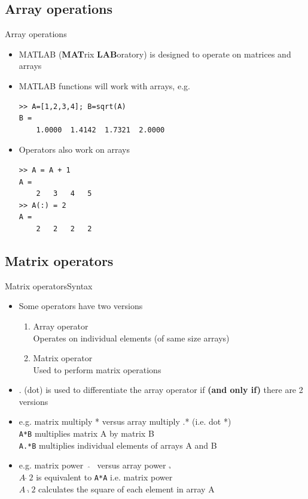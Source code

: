 \documentclass{beamer}
\begin{document}
\subsection{Array operations}
\begin{frame}[fragile]{Array operations}{}
	\begin{itemize}
		\item MATLAB (\textbf{MAT}rix \textbf{LAB}oratory) is designed to operate on matrices and arrays
		\item MATLAB functions will work with arrays, e.g.
		
		\begin{lstlisting}[style=Matlab-editor]
>> A=[1,2,3,4]; B=sqrt(A)
B = 
	1.0000	1.4142	1.7321	2.0000
		\end{lstlisting}
		
		\item Operators also work on arrays
		
		\begin{lstlisting}[style=Matlab-editor]
>> A = A + 1
A = 
	2	3	4	5		
>> A(:) = 2
A = 
	2	2	2	2
		\end{lstlisting}
	\end{itemize}
\end{frame}

\subsection{Matrix operators}
\begin{frame}{Matrix operators}{Syntax}
	\label{sec:matrix_operators}
	\begin{itemize}
		\item Some operators have two versions
		\begin{enumerate}
			\item Array operator\\
			Operates on individual elements (of same size arrays)
			\item Matrix operator\\
			Used to perform matrix operations
		\end{enumerate}
		\item . (dot) is used to differentiate the array operator if \textbf{(and only if)} there are 2 versions\\
		\item e.g. matrix multiply * versus array multiply .* (i.e. dot *)\\
		\texttt{A*B} multiplies matrix A by matrix B\\
		\texttt{A.*B} multiplies individual elements of arrays A and B\\
		\item e.g. matrix power \ $\hat{}$ \ versus array power .$\hat{}$\\
		\texttt{$A \ \hat{} \ 2$} is equivalent to \texttt{A*A} i.e. matrix power\\
		\texttt{$A \ . \hat{} \ 2$} calculates the square of each element in array A\\
	\end{itemize}
\end{frame}
\end{document}

